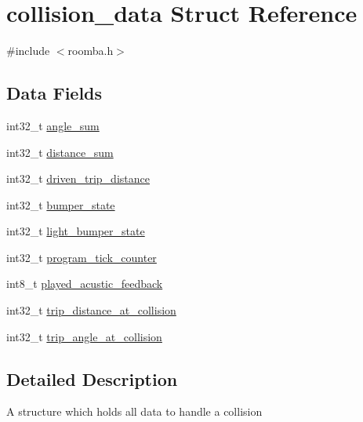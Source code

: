 \hypertarget{structcollision__data}{\section{collision\-\_\-data \-Struct \-Reference}
\label{structcollision__data}
}


{\ttfamily \#include $<$roomba.\-h$>$}

\subsection*{\-Data \-Fields}
\begin{DoxyCompactItemize}
\item 
int32\-\_\-t \hyperlink{structcollision__data_a7b6969b715149f30de60681a139e467f}{angle\-\_\-sum}
\item 
int32\-\_\-t \hyperlink{structcollision__data_a5d82d80b71d7c0371fbc631ae4944b86}{distance\-\_\-sum}
\item 
int32\-\_\-t \hyperlink{structcollision__data_a3dce872c749367a7762bdde1f33f639c}{driven\-\_\-trip\-\_\-distance}
\item 
int32\-\_\-t \hyperlink{structcollision__data_a2d865c62fc673dffe7dd64d7c49c2d95}{bumper\-\_\-state}
\item 
int32\-\_\-t \hyperlink{structcollision__data_ad40117dfe4921b4f52a9fcb49e76c3fa}{light\-\_\-bumper\-\_\-state}
\item 
int32\-\_\-t \hyperlink{structcollision__data_ae863069398d3aad944262da21ddf2870}{program\-\_\-tick\-\_\-counter}
\item 
int8\-\_\-t \hyperlink{structcollision__data_abc8ff00f84162de37e15e431872b7d3b}{played\-\_\-acustic\-\_\-feedback}
\item 
int32\-\_\-t \hyperlink{structcollision__data_ab029fc46a5f17b2301b1afa7baba9b66}{trip\-\_\-distance\-\_\-at\-\_\-collision}
\item 
int32\-\_\-t \hyperlink{structcollision__data_a9bf88bb25b13b5a18e0fdc887e3cf81c}{trip\-\_\-angle\-\_\-at\-\_\-collision}
\end{DoxyCompactItemize}


\subsection{\-Detailed \-Description}
\-A structure which holds all data to handle a collision 

